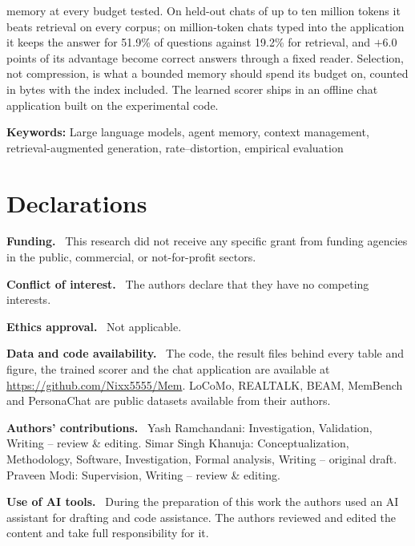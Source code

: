 \documentclass[11pt,a4paper]{article}
\renewcommand{\paragraph}[1]{\par\smallskip\noindent\textbf{#1}\ }
\begin{document}
{memory at every budget tested. On held-out chats of up to ten million tokens
it beats retrieval on every corpus; on million-token chats typed into the
application it keeps the answer for 51.9\% of questions against 19.2\% for
retrieval, and $+6.0$ points of its advantage become correct answers through a
fixed reader. Selection, not compression, is what a bounded memory should
spend its budget on, counted in bytes with the index included. The learned
scorer ships in an offline chat application built on the experimental code.
\par\medskip\noindent\textbf{Keywords:} Large language models, agent memory, context management,
retrieval-augmented generation, rate--distortion, empirical evaluation
\par}

\vspace{1.5em}



\section*{Declarations}

\paragraph{Funding.} This research did not receive any specific grant from
funding agencies in the public, commercial, or not-for-profit sectors.

\paragraph{Conflict of interest.} The authors declare that they have no
competing interests.

\paragraph{Ethics approval.} Not applicable.

\paragraph{Data and code availability.} The code, the result files behind
every table and figure, the trained scorer and the chat application are
available at \url{https://github.com/Nixx5555/Mem}. LoCoMo, REALTALK, BEAM,
MemBench and PersonaChat are public datasets available from their authors.

\paragraph{Authors' contributions.} Yash Ramchandani: Investigation,
Validation, Writing -- review \& editing. Simar Singh Khanuja:
Conceptualization, Methodology, Software, Investigation, Formal analysis,
Writing -- original draft. Praveen Modi: Supervision, Writing -- review \&
editing.

\paragraph{Use of AI tools.} During the preparation of this work the
authors used an AI assistant for drafting and code assistance. The authors
reviewed and edited the content and take full responsibility for it.



\end{document}
